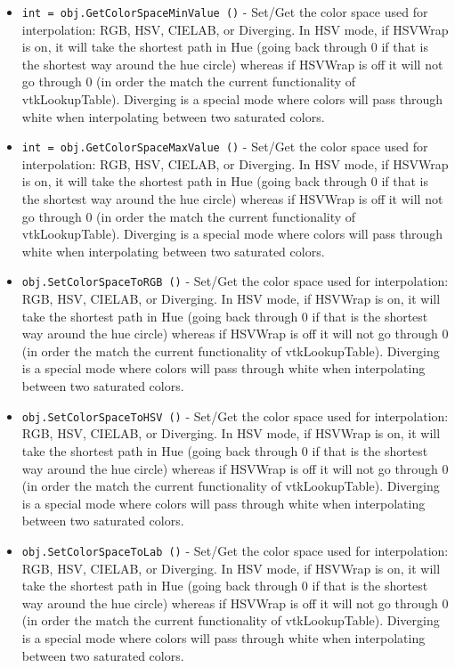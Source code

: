 \begin{itemize}
\item  \verb|int = obj.GetColorSpaceMinValue ()| -  Set/Get the color space used for interpolation: RGB, HSV, CIELAB, or
 Diverging.  In HSV mode, if HSVWrap is on, it will take the shortest path
 in Hue (going back through 0 if that is the shortest way around the hue
 circle) whereas if HSVWrap is off it will not go through 0 (in order the
 match the current functionality of vtkLookupTable).  Diverging is a special
 mode where colors will pass through white when interpolating between two
 saturated colors.

\item  \verb|int = obj.GetColorSpaceMaxValue ()| -  Set/Get the color space used for interpolation: RGB, HSV, CIELAB, or
 Diverging.  In HSV mode, if HSVWrap is on, it will take the shortest path
 in Hue (going back through 0 if that is the shortest way around the hue
 circle) whereas if HSVWrap is off it will not go through 0 (in order the
 match the current functionality of vtkLookupTable).  Diverging is a special
 mode where colors will pass through white when interpolating between two
 saturated colors.

\item  \verb|obj.SetColorSpaceToRGB ()| -  Set/Get the color space used for interpolation: RGB, HSV, CIELAB, or
 Diverging.  In HSV mode, if HSVWrap is on, it will take the shortest path
 in Hue (going back through 0 if that is the shortest way around the hue
 circle) whereas if HSVWrap is off it will not go through 0 (in order the
 match the current functionality of vtkLookupTable).  Diverging is a special
 mode where colors will pass through white when interpolating between two
 saturated colors.

\item  \verb|obj.SetColorSpaceToHSV ()| -  Set/Get the color space used for interpolation: RGB, HSV, CIELAB, or
 Diverging.  In HSV mode, if HSVWrap is on, it will take the shortest path
 in Hue (going back through 0 if that is the shortest way around the hue
 circle) whereas if HSVWrap is off it will not go through 0 (in order the
 match the current functionality of vtkLookupTable).  Diverging is a special
 mode where colors will pass through white when interpolating between two
 saturated colors.

\item  \verb|obj.SetColorSpaceToLab ()| -  Set/Get the color space used for interpolation: RGB, HSV, CIELAB, or
 Diverging.  In HSV mode, if HSVWrap is on, it will take the shortest path
 in Hue (going back through 0 if that is the shortest way around the hue
 circle) whereas if HSVWrap is off it will not go through 0 (in order the
 match the current functionality of vtkLookupTable).  Diverging is a special
 mode where colors will pass through white when interpolating between two
 saturated colors.


\end{itemize}

